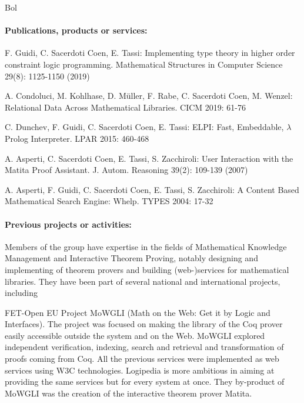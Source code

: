 \begin{sitedescription}{Bol}
\paragraph{Publications, products or services:}

\begin{compactitem}
\item F. Guidi, C. Sacerdoti Coen, E. Tassi:
Implementing type theory in higher order constraint logic programming. Mathematical Structures in Computer Science 29(8): 1125-1150 (2019)
\item A. Condoluci, M. Kohlhase, D. Müller, F. Rabe, C. Sacerdoti Coen, M. Wenzel: Relational Data Across Mathematical Libraries. CICM 2019: 61-76
\item C. Dunchev, F. Guidi, C. Sacerdoti Coen, E. Tassi:
ELPI: Fast, Embeddable, $\lambda$Prolog Interpreter. LPAR 2015: 460-468
\item A. Asperti, C. Sacerdoti Coen, E. Tassi, S. Zacchiroli:
User Interaction with the Matita Proof Assistant. J. Autom. Reasoning 39(2): 109-139 (2007)
\item A. Asperti, F. Guidi, C. Sacerdoti Coen, E. Tassi, S. Zacchiroli:
A Content Based Mathematical Search Engine: Whelp. TYPES 2004: 17-32
\end{compactitem}

\paragraph{Previous projects or activities:}

Members of the group have expertise in the fields of Mathematical Knowledge Management and Interactive Theorem Proving, notably designing and implementing of theorem provers and building (web-)services for mathematical libraries.
They have been part of several national and international projects, including

\begin{compactitem}
\item FET-Open EU Project MoWGLI (Math on the Web: Get it by Logic and Interfaces). The project was focused on making the library of the Coq prover easily accessible outside the system and on the Web. MoWGLI explored independent verification, indexing, search and retrieval and transformation of proofs coming from Coq. All the previous services were implemented as web services using W3C technologies. Logipedia is more ambitious in aiming at providing the same services but for every system at once. They by-product of MoWGLI was the creation of the interactive theorem prover Matita.


\end{compactitem}
\end{sitedescription}
